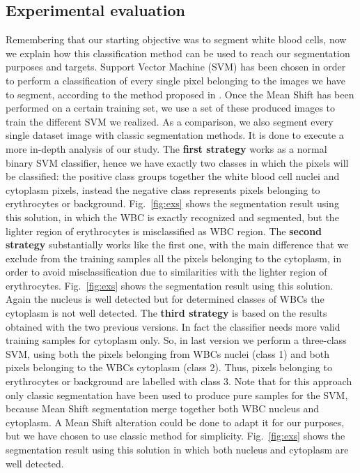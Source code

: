 \documentclass[final,a4paper,12pt,english]{UnicaPhdThesis3}
\begin{document}
	\subsection{Experimental evaluation}
	Remembering that our starting objective was to segment white blood cells, now we explain how this classification method can be used to reach our segmentation purposes and targets. Support Vector Machine (SVM) has been chosen in order to perform a classification of every single pixel belonging to the images we have to segment, according to the method proposed in \cite{Pan}. Once the Mean Shift has been performed on a certain training set, we use a set of these produced images to train the different SVM we realized. As a comparison, we also segment every single dataset image with classic segmentation methods. It is done to execute a more in-depth analysis of our study. The \textbf{first strategy} works as a normal binary SVM classifier, hence we have exactly two classes in which the pixels will be classified: the positive class groups together the white blood cell nuclei and cytoplasm pixels, instead the negative class represents pixels belonging to erythrocytes or background. Fig.~\ref{fig:exs} shows the segmentation result using this solution, in which the WBC is exactly recognized and segmented, but the lighter region of erythrocytes is misclassified as WBC region. The \textbf{second strategy} substantially works like the first one, with the main difference that we exclude from the training samples all the pixels belonging to the cytoplasm, in order to avoid misclassification due to similarities with the lighter region of erythrocytes. Fig.~\ref{fig:exs} shows the segmentation result using this solution. Again the nucleus is well detected but for determined classes of WBCs the cytoplasm is not well detected. The \textbf{third strategy} is based on the results obtained with the two previous versions. In fact the classifier needs more valid training samples for cytoplasm only. So, in last version we perform a three-class SVM, using both the pixels belonging from WBCs nuclei (class 1) and both pixels belonging to the WBCs cytoplasm (class 2). Thus, pixels belonging to erythrocytes or background are labelled with class 3. Note that for this approach only classic segmentation have been used to produce pure samples for the SVM, because Mean Shift segmentation merge together both WBC nucleus and cytoplasm. A Mean Shift alteration could be done to adapt it for our purposes, but we have chosen to use classic method for simplicity. Fig.~\ref{fig:exs} shows the segmentation result using this solution in which both nucleus and cytoplasm are well detected.
\end{document}
